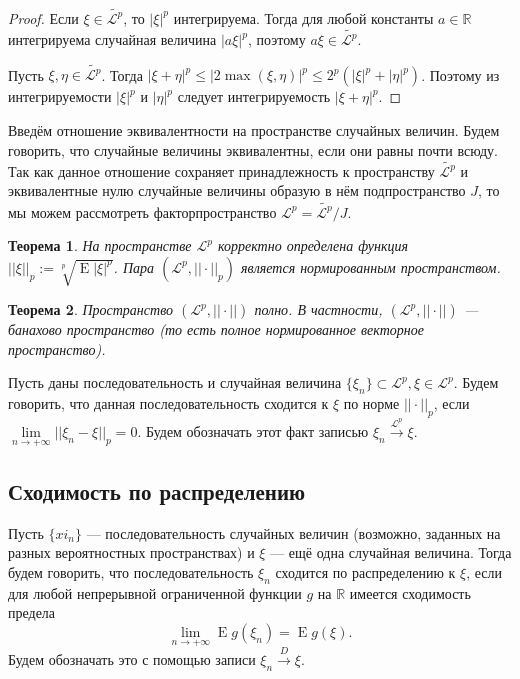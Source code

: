 \documentclass[12pt]{article}
\newtheorem{theorem}{Теорема}
\numberwithin{theorem}{section}
\theoremstyle{definition}
\newcommand{\defin}[2]{\hypertarget{#2}{{\color{red} #1}}}
\newcommand{\RR}{\mathbb{R}}
\newcommand{\expect}{\operatorname{E}}
\begin{document}
	\begin{proof}
		Если $ \xi \in \tilde{\mathcal{L}^p} $, то $ |\xi|^p $ интегрируема.
		Тогда для любой константы $ a \in \RR $ интегрируема случайная величина $ |a\xi|^p $,
		поэтому $ a\xi \in \tilde{\mathcal{L}^p} $.
		
		Пусть $ \xi, \eta \in \tilde{\mathcal{L}^p} $.
		Тогда $ |\xi + \eta|^p \leqslant |2\max(\xi, \eta)|^p \leqslant 2^p(|\xi|^p + |\eta|^p) $.
		Поэтому из интегрируемости $ |\xi|^p $ и $ |\eta|^p $ следует интегрируемость
		$ |\xi + \eta|^p $.
	\end{proof}
	
	Введём отношение эквивалентности на пространстве случайных величин.
	Будем говорить, что случайные величины эквивалентны, если они равны почти всюду.
	Так как данное отношение сохраняет принадлежность к пространству $ \tilde{\mathcal{L}^p} $
	и эквивалентные нулю случайные величины образую в нём подпространство $ J $,
	то мы можем рассмотреть факторпространство $ \mathcal{L}^p = \tilde{\mathcal{L}^p}/J $.
	
	\begin{theorem}
		На пространстве $ \mathcal{L}^p $ корректно определена
		функция $ ||\xi||_p := \sqrt[p]{\expect|\xi|^p} $.
		Пара $ (\mathcal{L}^p, ||\cdot||_p) $ является нормированным пространством.
	\end{theorem}
	
	\begin{theorem}
		Пространство $ (\mathcal{L}^p, ||\cdot||) $ полно. В частности, $  (\mathcal{L}^p, ||\cdot||)  $
		--- банахово пространство (то есть полное нормированное векторное пространство).
	\end{theorem}
	
	Пусть даны последовательность и случайная величина $ \{\xi_n\} \subset \mathcal{L}^p, \xi \in \mathcal{L}^p $.
	Будем говорить, что данная последовательность \defin{сходится к $ \xi $ по норме $ ||\cdot||_p $}{in-normed-space},
	если $ \lim\limits_{n \to +\infty} ||\xi_n - \xi||_p = 0 $. 
	Будем обозначать этот факт записью $ \xi_n \overset{\mathcal{L}^p}{\to} \xi $.
	
	\subsection{Сходимость по распределению}
	
	Пусть $ \{xi_n\} $ --- последовательность случайных величин (возможно, заданных на разных вероятностных пространствах)
	и $ \xi $ --- ещё одна случайная величина.
	Тогда будем говорить, что последовательность $ \xi_n $ \defin{сходится по распределению}{in-distribution} к $ \xi $,
	если для любой непрерывной ограниченной функции $ g $ на $ \RR $ имеется сходимость предела
	$$ \lim\limits_{n \to +\infty} \expect g(\xi_n) = \expect g(\xi). $$
	Будем обозначать это с помощью записи $ \xi_n \overset{D}{\to} \xi $.
	
\end{document}
